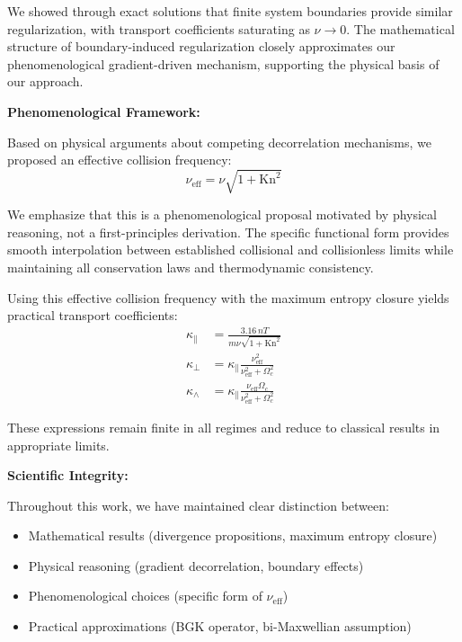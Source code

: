 \documentclass[12pt,a4paper]{article}
\newcommand{\Kn}{\text{Kn}}
\newcommand{\eff}{\text{eff}}
\begin{document}
We showed through exact solutions that finite system boundaries provide similar regularization, with transport coefficients saturating as $\nu \to 0$. The mathematical structure of boundary-induced regularization closely approximates our phenomenological gradient-driven mechanism, supporting the physical basis of our approach.

\textbf{Phenomenological Framework:}

Based on physical arguments about competing decorrelation mechanisms, we proposed an effective collision frequency:
\begin{equation}
\nu_{\eff} = \nu\sqrt{1 + \Kn^2}
\label{eq:nu_eff_final}
\end{equation}

We emphasize that this is a phenomenological proposal motivated by physical reasoning, not a first-principles derivation. The specific functional form provides smooth interpolation between established collisional and collisionless limits while maintaining all conservation laws and thermodynamic consistency.

Using this effective collision frequency with the maximum entropy closure yields practical transport coefficients:
\begin{align}
\kappa_{\parallel} &= \frac{3.16 \, nT}{m\nu\sqrt{1 + \Kn^2}}\label{eq:final_kappa_parallel}\\
\kappa_{\perp} &= \kappa_{\parallel} \frac{\nu_{\eff}^2}{\nu_{\eff}^2 + \Omega_c^2}\label{eq:final_kappa_perp}\\
\kappa_{\wedge} &= \kappa_{\parallel} \frac{\nu_{\eff}\Omega_c}{\nu_{\eff}^2 + \Omega_c^2}\label{eq:final_kappa_hall}
\end{align}

These expressions remain finite in all regimes and reduce to classical results in appropriate limits.

\textbf{Scientific Integrity:}

Throughout this work, we have maintained clear distinction between:
\begin{itemize}[leftmargin=*]
\item Mathematical results (divergence propositions, maximum entropy closure)
\item Physical reasoning (gradient decorrelation, boundary effects)
\item Phenomenological choices (specific form of $\nu_{\eff}$)
\item Practical approximations (BGK operator, bi-Maxwellian assumption)
\end{itemize}
\end{document}

